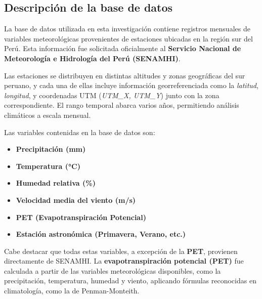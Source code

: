 \begin{landscape}
\begin{longtable}{P{3.5cm} P{2.2cm} P{3.5cm} P{2.7cm} P{2.4cm} P{6cm}}
\end{longtable}
\end{landscape}

\subsection*{Descripción de la base de datos}

La base de datos utilizada en esta investigación contiene registros mensuales de variables meteorológicas provenientes de estaciones ubicadas en la región sur del Perú. Esta información fue solicitada oficialmente al \textbf{Servicio Nacional de Meteorología e Hidrología del Perú (SENAMHI)}.

Las estaciones se distribuyen en distintas altitudes y zonas geográficas del sur peruano, y cada una de ellas incluye información georreferenciada como la \textit{latitud}, \textit{longitud}, y coordenadas UTM (\textit{UTM\_X, UTM\_Y}) junto con la zona correspondiente. El rango temporal abarca varios años, permitiendo análisis climáticos a escala mensual.

Las variables contenidas en la base de datos son:

\begin{itemize}
  \item \textbf{Precipitación (mm)}
  \item \textbf{Temperatura (°C)}
  \item \textbf{Humedad relativa (\%)}
  \item \textbf{Velocidad media del viento (m/s)}
  \item \textbf{PET (Evapotranspiración Potencial)}
  \item \textbf{Estación astronómica (Primavera, Verano, etc.)}
\end{itemize}

Cabe destacar que todas estas variables, a excepción de la \textbf{PET}, provienen directamente de SENAMHI. La \textbf{evapotranspiración potencial (PET)} fue calculada a partir de las variables meteorológicas disponibles, como la precipitación, temperatura, humedad y viento, aplicando fórmulas reconocidas en climatología, como la de Penman-Monteith.

